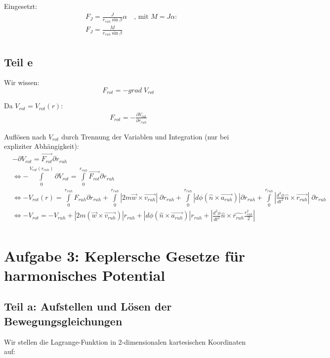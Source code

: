 \documentclass[a4paper,german,12pt,smallheadings]{scrartcl}
\begin{document}
Eingesetzt:
\begin{align*}
& F_J=\frac{J}{r_{ruh}\sin\beta}\alpha \quad \text{, mit $M=J\alpha$:}\\
& F_J=\frac{M}{r_{ruh}\sin\beta}\\
\end{align*}


\subsection*{Teil e}

Wir wissen:
\begin{equation*}
F_{rot}=-grad \; V_{rot}
\end{equation*}

Da $V_{rot}=V_{rot}(r)$:
\begin{align*}
F_{rot}=-\frac{\partial V_{rot}}{\partial r_{ruh}}
\end{align*}

Auflösen nach $V_{rot}$ durch Trennung der Variablen und Integration (nur bei expliziter Abhängigkeit):
\begin{align*}
& -\partial V_{rot}=\vec{F_{rot}}\partial r_{ruh}\\
& \Leftrightarrow -\int\limits_{0}^{V_{rot}(r_{ruh})}\partial V_{rot}=\int\limits_{0}^{r_{ruh}}\vec{F_{rot}}\partial r_{ruh}\\
& \Leftrightarrow -V_{rot}(r)=\int\limits_{0}^{r_{ruh}}F_{ruh}\partial r_{ruh}+\int\limits_{0}^{r_{ruh}}|2m\vec{w}\times\vec{v_{ruh}}|\;\partial r_{ruh}+\int\limits_{0}^{r_{ruh}}|d\phi\left(\hat{n}\times\vec{a_{ruh}}\right)|\partial r_{ruh}+\int\limits_{0}^{r_{ruh}}|\frac{d^2\phi}{dt^2}\hat{n}\times\vec{r_{ruh}}|\;\partial r_{ruh}\\
& \Leftrightarrow -V_{rot}=-V_{ruh}+|2m\left(\vec{w}\times\vec{v_{ruh}}\right)|r_{ruh}+|d\phi\left(\hat{n}\times\vec{a_{ruh}}\right)|r_{ruh}+|\frac{d^2\phi}{dt^2}\hat{n}\times\hat{r_{ruh}}\frac{r_{ruh}^2}{2}|\\
\end{align*}

\section*{Aufgabe 3: Keplersche Gesetze für harmonisches Potential}
\subsection*{Teil a: Aufstellen und Lösen der Bewegungsgleichungen}
Wir stellen die Lagrange-Funktion in 2-dimensionalen kartesischen Koordinaten
auf:
\end{document}
